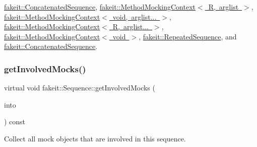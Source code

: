 \mbox{\hyperlink{classfakeit_1_1ConcatenatedSequence_a176b1d4dac2e552f646c2c3ce98f0d1f}{fakeit\+::\+Concatenated\+Sequence}}, \mbox{\hyperlink{classfakeit_1_1MethodMockingContext_ab88d912b17801968fab8443079e2eabc}{fakeit\+::\+Method\+Mocking\+Context$<$ R, arglist $>$}}, \mbox{\hyperlink{classfakeit_1_1MethodMockingContext_ab88d912b17801968fab8443079e2eabc}{fakeit\+::\+Method\+Mocking\+Context$<$ void, arglist... $>$}}, \mbox{\hyperlink{classfakeit_1_1MethodMockingContext_ab88d912b17801968fab8443079e2eabc}{fakeit\+::\+Method\+Mocking\+Context$<$ R, arglist... $>$}}, \mbox{\hyperlink{classfakeit_1_1MethodMockingContext_ab88d912b17801968fab8443079e2eabc}{fakeit\+::\+Method\+Mocking\+Context$<$ void $>$}}, \mbox{\hyperlink{classfakeit_1_1RepeatedSequence_a65b5f62fe0ba9da31b99f28c1a2e53f2}{fakeit\+::\+Repeated\+Sequence}}, and \mbox{\hyperlink{classfakeit_1_1ConcatenatedSequence_a176b1d4dac2e552f646c2c3ce98f0d1f}{fakeit\+::\+Concatenated\+Sequence}}.

\mbox{\label{classfakeit_1_1Sequence_a4af96a0de0fa659fe826431e4d61757a}} 
\subsubsection{\texorpdfstring{getInvolvedMocks()}{getInvolvedMocks()}\hspace{0.1cm}{\footnotesize\ttfamily [1/9]}}
{\footnotesize\ttfamily virtual void fakeit\+::\+Sequence\+::get\+Involved\+Mocks (\begin{DoxyParamCaption}\item[{std\+::vector$<$ \mbox{\hyperlink{structfakeit_1_1ActualInvocationsSource}{Actual\+Invocations\+Source}} $\ast$ $>$ \&}]{into }\end{DoxyParamCaption}) const\hspace{0.3cm}{\ttfamily [pure virtual]}}



Collect all mock objects that are involved in this sequence. 



